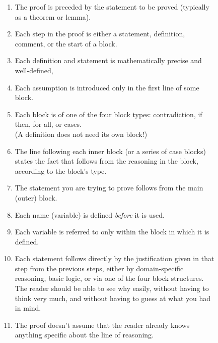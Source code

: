\begin{figure}
\begin{myframed}
\begin{enumerate}
  \setlength{\labelwidth}{1em}
  \setlength{\labelsep}{1em}
  \setlength{\leftmargin}{-1em}
  \setlength{\itemsep}{0em}

\item The proof is preceded by the statement to be proved (typically as a theorem or lemma).

\item
  Each step in the proof is either
  a statement,
  definition,
  comment,
  or the start of a block.

\item
  Each definition and statement is mathematically precise and well-defined,

\item Each assumption is introduced only in the first line of some block.

\item Each block is of one of the four block types:
  contradiction, if then, for all, or cases.
\\  (A definition does not need its own block!)

\item The line following each inner block (or a series of case blocks)
  states the fact
  that follows from the reasoning in the block, according to the block's type.

\item The statement you are trying to prove follows from the main (outer) block.


\item  Each name (variable) is defined \emph{before} it is used.

\item  Each variable is referred to   only within the block in which it is defined.

\item Each statement follows directly by the justification given in that step
  from the previous steps, either by domain-specific reasoning,
  basic logic, or via one of the four block structures.
  The reader should be able to see why easily,
  without having to think very much,
  and without having to guess at what you had in mind.

\item
  The proof doesn't assume that the reader already knows anything specific about the line of reasoning.


\end{enumerate}
\end{myframed}
\end{figure}
